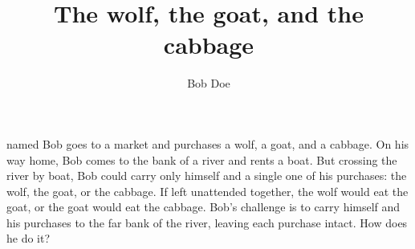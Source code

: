 \documentclass[a4paper,twoside] {article}
\title{The wolf, the goat,\alice[disable]{Adding the Oxford comma here} and the cabbage}
\author{Bob Doe}
\begin{document}
\maketitle


named Bob goes to a market and
purchases a wolf, a goat, and a cabbage. On his way home, Bob comes to
the bank of a river and rents a boat. But crossing the river by boat, Bob
could carry only himself and a single one of his purchases: the wolf, the goat,
or the cabbage.
%
If left unattended together, the wolf would eat the goat, or the goat would eat
the cabbage.
%
Bob's challenge is to carry himself and his purchases to the far bank of
the river, leaving each purchase intact. How does he do it?
\end{document}
